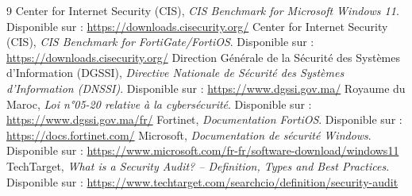 \documentclass[11pt,a4paper,oneside]{report}
\begin{document}
\clearpage{}
{}
\renewcommand{\bibname}{Bibliographie}
\begin{thebibliography}{9}
\setlength{\itemsep}{0.6em}
 Center for Internet Security (CIS), \emph{CIS Benchmark for Microsoft Windows 11}. Disponible sur : \url{https://downloads.cisecurity.org/}
 Center for Internet Security (CIS), \emph{CIS Benchmark for FortiGate/FortiOS}. Disponible sur : \url{https://downloads.cisecurity.org/}
 Direction Générale de la Sécurité des Systèmes d'Information (DGSSI), \emph{Directive Nationale de Sécurité des Systèmes d'Information (DNSSI)}. Disponible sur : \url{https://www.dgssi.gov.ma/}
 Royaume du Maroc, \emph{Loi n°05-20 relative à la cybersécurité}. Disponible sur : \url{https://www.dgssi.gov.ma/fr/}
 Fortinet, \emph{Documentation FortiOS}. Disponible sur : \url{https://docs.fortinet.com/}
 Microsoft, \emph{Documentation de sécurité Windows}. Disponible sur : \url{https://www.microsoft.com/fr-fr/software-download/windows11}
 TechTarget, \emph{What is a Security Audit? – Definition, Types and Best Practices}. Disponible sur : \url{https://www.techtarget.com/searchcio/definition/security-audit}
\end{thebibliography}
\end{document}
